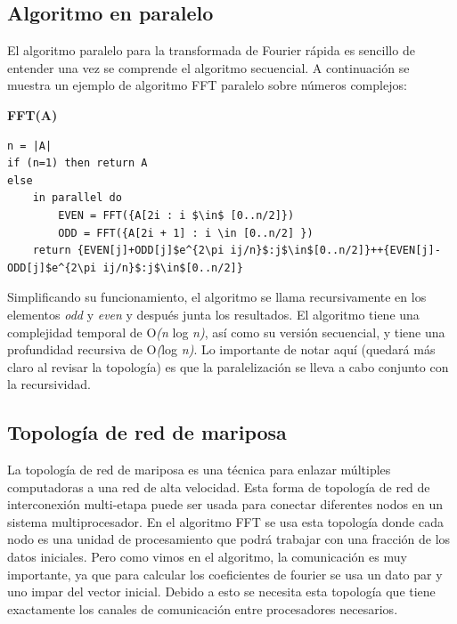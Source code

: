 \documentclass{report}
\begin{document}
\subsection*{Algoritmo en paralelo}
El algoritmo paralelo para la transformada de Fourier rápida es sencillo de entender una vez se comprende el algoritmo secuencial. A continuación se muestra un ejemplo de algoritmo FFT paralelo sobre números complejos:
\vspace{0.4cm}

\noindent
\textbf{\large FFT(A)}\medskip

\begin{lstlisting}[frame=single, mathescape]
n = |A|
if (n=1) then return A
else
    in parallel do
        EVEN = FFT({A[2i : i $\in$ [0..n/2]})
        ODD = FFT({A[2i + 1] : i \in [0..n/2] })
    return {EVEN[j]+ODD[j]$e^{2\pi ij/n}$:j$\in$[0..n/2]}++{EVEN[j]-ODD[j]$e^{2\pi ij/n}$:j$\in$[0..n/2]}

\end{lstlisting}

Simplificando su funcionamiento, el algoritmo se llama recursivamente en los elementos \textit{odd} y \textit{even} y después junta los resultados. El algoritmo tiene una complejidad temporal de O\textit{(n} log \textit{n)}, así como su versión secuencial, y tiene una profundidad recursiva de O\textit{(}log \textit{n)}. Lo importante de notar aquí (quedará más claro al revisar la topología) es que la paralelización se lleva a cabo conjunto con la recursividad.\medskip

\subsection*{Topología de red de mariposa}

\noindent La topología de red de mariposa es una técnica para enlazar múltiples computadoras a una red de alta velocidad. Esta forma de topología de red de interconexión multi-etapa puede ser usada para conectar diferentes nodos en un sistema multiprocesador. En el algoritmo FFT se usa esta topología donde cada nodo es una unidad de procesamiento que podrá trabajar con una fracción de los datos iniciales. Pero como vimos en el algoritmo, la comunicación es muy importante, ya que para calcular los coeficientes de fourier se usa un dato par y uno impar del vector inicial. Debido a esto se necesita esta topología que tiene exactamente los canales de comunicación entre procesadores necesarios.\medskip
\end{document}
